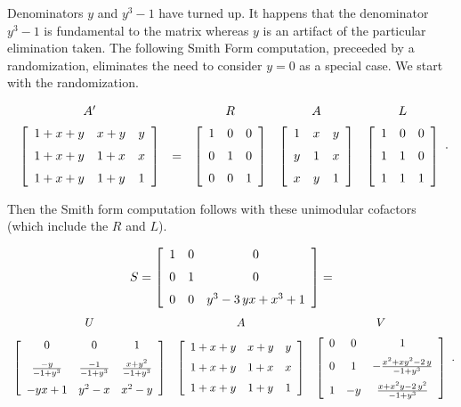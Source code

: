 Denominators $y$ and $y^3 - 1$ have turned up.  It happens that the denominator $y^3 - 1$ is 
fundamental to the matrix whereas $y$ is an artifact of the particular elimination taken.
The following Smith Form computation, preceeded by a randomization, eliminates the need
to consider $y = 0$ as a special case. We start with the randomization.

\[
\begin{array}{ccccc}
A' & ~ & R & A & L\\\noalign{\medskip}
\left [\begin {array}{ccc} 
1+x+y&x+y&y\\\noalign{\medskip}
1+x+y&1+x&x\\\noalign{\medskip}
1+x+y&1+y&1\end {array}\right ]
& = & 
\left [\begin {array}{ccc} 
1&0&0\\\noalign{\medskip}
0&1&0\\\noalign{\medskip}
0&0&1\end {array}\right ]
&
\left [\begin {array}{ccc} 
1&x&y\\\noalign{\medskip}
y&1&x\\\noalign{\medskip}
x&y&1\end {array}\right ]
&
\left [\begin {array}{ccc} 
1&0&0\\\noalign{\medskip}
1&1&0\\\noalign{\medskip}
1&1&1\end {array}\right ]
\end{array}.
\]
 
Then the Smith form computation follows with these unimodular cofactors 
(which include the $R$ and $L$).

\[
S = 
\left [\begin {array}{ccc} 
1&0&0\\\noalign{\medskip}
0&1&0\\\noalign{\medskip}
0&0&{y}^{3}-3\,yx+{x}^{3}+1\end {array}\right ] =
\]\[
\begin{array}{cccc}
U & A & V\\\noalign{\medskip}
\left [\begin {array}{ccc} 
0&0&1\\\noalign{\medskip}
{\frac {-y}{-1+{y}^{3}}}&{\frac {-1}{-1+{y}^{3}}}&{\frac {x+{y}^{2}}{-1+{y}^{3}}}\\\noalign{\medskip}
-yx+1&{y}^{2}-x&{x}^{2}-y\end {array}\right ]
&
\left [\begin {array}{ccc} 
1+x+y&x+y&y\\\noalign{\medskip}
1+x+y&1+x&x\\\noalign{\medskip}
1+x+y&1+y&1\end {array}\right ]
&
\left [\begin {array}{ccc} 0&0&1\\\noalign{\medskip}0&1&-{\frac {{x}^{2
}+x{y}^{2}-2\,y}{-1+{y}^{3}}}\\\noalign{\medskip}1&-y&{\frac {x+{x}^{2}
y-2\,{y}^{2}}{-1+{y}^{3}}}\end {array}\right ]
\end{array}.
\]

